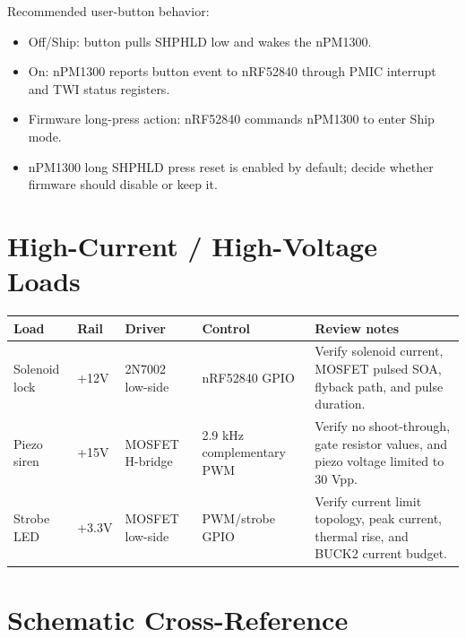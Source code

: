 \documentclass[11pt,a4paper]{article}
\begin{document}
Recommended user-button behavior:
\begin{itemize}
  \item Off/Ship: button pulls SHPHLD low and wakes the nPM1300.
  \item On: nPM1300 reports button event to nRF52840 through PMIC interrupt and TWI status registers.
  \item Firmware long-press action: nRF52840 commands nPM1300 to enter Ship mode.
  \item nPM1300 long SHPHLD press reset is enabled by default; decide whether firmware should disable or keep it.
\end{itemize}

\section{High-Current / High-Voltage Loads}

\begin{table}[h]
\small
\begin{tabularx}{\textwidth}{llllL}
\toprule
\textbf{Load} & \textbf{Rail} & \textbf{Driver} & \textbf{Control} & \textbf{Review notes}\\
\midrule
Solenoid lock & +12V & 2N7002 low-side & nRF52840 GPIO & Verify solenoid current, MOSFET pulsed SOA, flyback path, and pulse duration.\\
Piezo siren & +15V & MOSFET H-bridge & 2.9 kHz complementary PWM & Verify no shoot-through, gate resistor values, and piezo voltage limited to 30 Vpp.\\
Strobe LED & +3.3V & MOSFET low-side & PWM/strobe GPIO & Verify current limit topology, peak current, thermal rise, and BUCK2 current budget.\\
\bottomrule
\end{tabularx}
\end{table}

\section{Schematic Cross-Reference}
\end{document}
